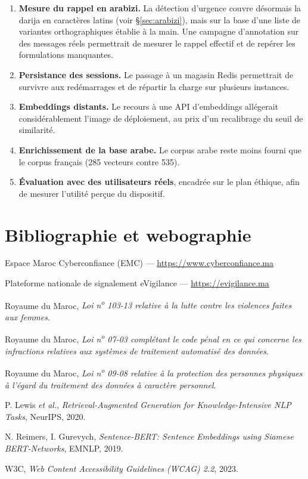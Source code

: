 \documentclass[a4paper,11pt,twoside]{report}
\begin{document}
\begin{enumerate}[itemsep=2pt]
  \item \textbf{Mesure du rappel en arabizi.} La détection d'urgence couvre
  désormais la darija en caractères latins (voir \S\ref{sec:arabizi}), mais sur
  la base d'une liste de variantes orthographiques établie à la main. Une
  campagne d'annotation sur des messages réels permettrait de mesurer le rappel
  effectif et de repérer les formulations manquantes.
  \item \textbf{Persistance des sessions.} Le passage à un magasin Redis
  permettrait de survivre aux redémarrages et de répartir la charge sur
  plusieurs instances.
  \item \textbf{Embeddings distants.} Le recours à une API d'embeddings
  allégerait considérablement l'image de déploiement, au prix d'un recalibrage
  du seuil de similarité.
  \item \textbf{Enrichissement de la base arabe.} Le corpus arabe reste moins
  fourni que le corpus français (285 vecteurs contre 535).
  \item \textbf{Évaluation avec des utilisateurs réels}, encadrée sur le plan
  éthique, afin de mesurer l'utilité perçue du dispositif.
\end{enumerate}

\chapter*{Bibliographie et webographie}

\begin{enumerate}[itemsep=2pt,label={[\arabic*]}]
  \item Espace Maroc Cyberconfiance (EMC) — \url{https://www.cyberconfiance.ma}
  \item Plateforme nationale de signalement eVigilance — \url{https://evigilance.ma}
  \item Royaume du Maroc, \emph{Loi n\textsuperscript{o} 103-13 relative à la lutte contre les violences faites aux femmes}.
  \item Royaume du Maroc, \emph{Loi n\textsuperscript{o} 07-03 complétant le code pénal en ce qui concerne les infractions relatives aux systèmes de traitement automatisé des données}.
  \item Royaume du Maroc, \emph{Loi n\textsuperscript{o} 09-08 relative à la protection des personnes physiques à l'égard du traitement des données à caractère personnel}.
  \item P. Lewis \emph{et al.}, \emph{Retrieval-Augmented Generation for Knowledge-Intensive NLP Tasks}, NeurIPS, 2020.
  \item N. Reimers, I. Gurevych, \emph{Sentence-BERT: Sentence Embeddings using Siamese BERT-Networks}, EMNLP, 2019.
  \item W3C, \emph{Web Content Accessibility Guidelines (WCAG) 2.2}, 2023.
\end{enumerate}
\end{document}
